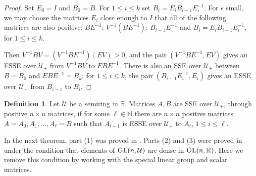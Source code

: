 \documentclass{amsart}
\theoremstyle{definition}
\newtheorem{definition}[theorem]{Definition}
\theoremstyle{remark}
\numberwithin{equation}{section}
\begin{document}
{{\begin{proof}
Set $E_0=I$ and $B_0=B$. 
For $1\leq i \leq k$ set $B_i=E_iB_{i-1}E_i^{-1}$. 
For $\epsilon$ small, we may choose the matrices 
$E_i$ close enough to $I$ that all of the following matrices 
are also positive: 
$BE^{-1}$; $V^{-1}(BE^{-1})$; $B_{i-1}E^{-1}$ and 
$B_i=E_iB_{i-1}E_i^{-1}$, for $1\leq i\leq k$.  

Then $V^{-1}BV= (V^{-1}BE^{-1})( EV) > 0$, and  
the pair $(V^{-1}BE^{-1}, EV)$ gives 
an  ESSE over ${\mathcal U}_+$ from 
$V^{-1}BV$  to  $EBE^{-1}$. There is also 
an SSE over ${\mathcal U}_+$ between $B=B_0$ and 
$EBE^{-1}=B_k$: 
for $1\leq i\leq k$, 
the pair $(B_{i-1}E_i^{-1},E_i)$ gives  
an  ESSE over ${\mathcal U}_+$ from $B_{i-1}$ to $B_i$. 

\end{proof} 

 \begin{definition} \label{throughpositivedefinition}
Let ${\mathcal U}$ be a semiring in $\mathbb R$. 
Matrices $A,B$ are SSE over ${\mathcal U}_+$,  
through positive $n\times n$ matrices,  if for 
some $\ell\in \mathbb N$ there are $n\times n$ 
positive matrices   
$A=A_0, A_1, \dots , A_{\ell}=B$ such that 
$A_{i-1} $ is ESSE over ${\mathcal U}_+$ to $A_i$, $1\leq i \leq \ell$.  
\end{definition} 

In the next theorem, part (1)  was proved in \cite{KR3}. 
Parts (2) and (3) were 
 proved in \cite{KR4} 
under the condition 
that elements of $\textnormal{GL}(n,\mathcal U)$ are dense in $\textnormal{GL}(n,\mathbb R)$.  
Here we remove this 
condition by working with the special linear group and scalar matrices.

}}
\end{document}
